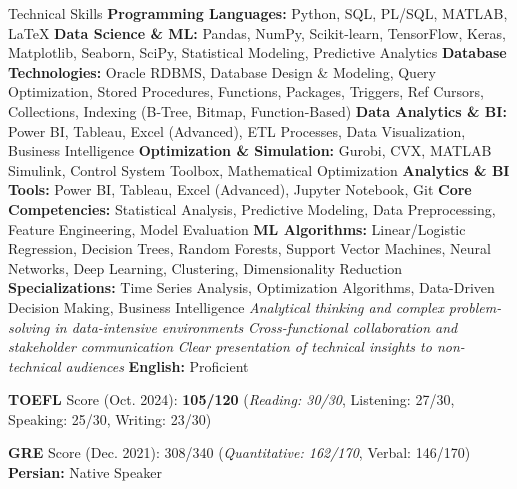 \begin{rubric}{Technical Skills}
\entry*%
    \textbf{Programming Languages:} Python, SQL, PL/SQL, MATLAB, \LaTeX
\entry*%
    \textbf{Data Science \& ML:} Pandas, NumPy, Scikit-learn, TensorFlow, Keras, Matplotlib, Seaborn, SciPy, Statistical Modeling, Predictive Analytics
\entry*%
    \textbf{Database Technologies:} Oracle RDBMS, Database Design \& Modeling, Query Optimization, Stored Procedures, Functions, Packages, Triggers, Ref Cursors, Collections, Indexing (B-Tree, Bitmap, Function-Based)
\entry*%
    \textbf{Data Analytics \& BI:} Power BI, Tableau, Excel (Advanced), ETL Processes, Data Visualization, Business Intelligence
\entry*%
    \textbf{Optimization \& Simulation:} Gurobi, CVX, MATLAB Simulink, Control System Toolbox, Mathematical Optimization
\entry*%
    \textbf{Analytics \& BI Tools:} Power BI, Tableau, Excel (Advanced), Jupyter Notebook, Git
\entry*%
    \textbf{Core Competencies:} Statistical Analysis, Predictive Modeling, Data Preprocessing, Feature Engineering, Model Evaluation
\entry*%
    \textbf{ML Algorithms:} Linear/Logistic Regression, Decision Trees, Random Forests, Support Vector Machines, Neural Networks, Deep Learning, Clustering, Dimensionality Reduction
\entry*%
    \textbf{Specializations:} Time Series Analysis, Optimization Algorithms, Data-Driven Decision Making, Business Intelligence
\entry*%
    \textit{Analytical thinking and complex problem-solving in data-intensive environments}
\entry*%
    \textit{Cross-functional collaboration and stakeholder communication}
\entry*%
    \textit{Clear presentation of technical insights to non-technical audiences}
\entry*%
    \textbf{English:} Proficient  
    \par \textbf{TOEFL} Score (Oct. 2024): \textbf{105/120} (\textit{Reading: 30/30}, Listening: 27/30, Speaking: 25/30, Writing: 23/30)  
    \par \textbf{GRE} Score (Dec. 2021): 308/340 (\textit{Quantitative: 162/170}, Verbal: 146/170)
\entry*%
    \textbf{Persian:} Native Speaker
\end{rubric}


